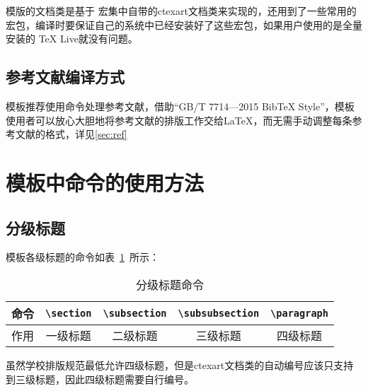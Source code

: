 模版的文档类是基于\CTeX{} 宏集中自带的ctexart文档类来实现的，还用到了一些常用的宏包，编译时要保证自己的系统中已经安装好了这些宏包，如果用户使用的是全量安装的 TeX Live就没有问题。

\subsection{参考文献编译方式}

模板推荐使用\verb||命令处理参考文献，借助“GB/T 7714—2015 BibTeX Style”，模板使用者可以放心大胆地将参考文献的排版工作交给\LaTeX ，而无需手动调整每条参考文献的格式，详见\ref{sec:ref}

\section{模板中命令的使用方法}

\subsection{分级标题}

模板各级标题的命令如表~\ref{table_title_command}~所示：

\begin{table}[htbp!]
    \centering
    \caption{分级标题命令}
    \label{table_title_command}
    \begin{tabular}{ccccc}
        \toprule
        命令 & \verb|\section| & \verb|\subsection| & \verb|\subsubsection| & \verb|\paragraph| \\
        \midrule
        作用 & 一级标题        & 二级标题           & 三级标题              & 四级标题          \\
        \bottomrule
    \end{tabular}
\end{table}

虽然学校排版规范最低允许四级标题，但是ctexart文档类的自动编号应该只支持到三级标题，因此四级标题需要自行编号。

